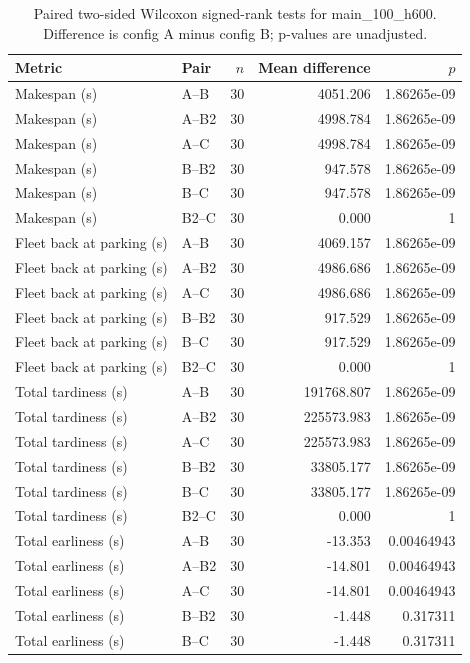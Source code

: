\begin{table}[t]
\centering
\caption{Paired two-sided Wilcoxon signed-rank tests for main\_100\_h600. Difference is config A minus config B; p-values are unadjusted.}
\label{tab:main-100-h600-paired}
\begin{tabular}{llrrr}
\toprule
Metric & Pair & $n$ & Mean difference & $p$ \\
\midrule
Makespan (s) & A--B & 30 & 4051.206 & 1.86265e-09 \\
Makespan (s) & A--B2 & 30 & 4998.784 & 1.86265e-09 \\
Makespan (s) & A--C & 30 & 4998.784 & 1.86265e-09 \\
Makespan (s) & B--B2 & 30 & 947.578 & 1.86265e-09 \\
Makespan (s) & B--C & 30 & 947.578 & 1.86265e-09 \\
Makespan (s) & B2--C & 30 & 0.000 & 1 \\
Fleet back at parking (s) & A--B & 30 & 4069.157 & 1.86265e-09 \\
Fleet back at parking (s) & A--B2 & 30 & 4986.686 & 1.86265e-09 \\
Fleet back at parking (s) & A--C & 30 & 4986.686 & 1.86265e-09 \\
Fleet back at parking (s) & B--B2 & 30 & 917.529 & 1.86265e-09 \\
Fleet back at parking (s) & B--C & 30 & 917.529 & 1.86265e-09 \\
Fleet back at parking (s) & B2--C & 30 & 0.000 & 1 \\
Total tardiness (s) & A--B & 30 & 191768.807 & 1.86265e-09 \\
Total tardiness (s) & A--B2 & 30 & 225573.983 & 1.86265e-09 \\
Total tardiness (s) & A--C & 30 & 225573.983 & 1.86265e-09 \\
Total tardiness (s) & B--B2 & 30 & 33805.177 & 1.86265e-09 \\
Total tardiness (s) & B--C & 30 & 33805.177 & 1.86265e-09 \\
Total tardiness (s) & B2--C & 30 & 0.000 & 1 \\
Total earliness (s) & A--B & 30 & -13.353 & 0.00464943 \\
Total earliness (s) & A--B2 & 30 & -14.801 & 0.00464943 \\
Total earliness (s) & A--C & 30 & -14.801 & 0.00464943 \\
Total earliness (s) & B--B2 & 30 & -1.448 & 0.317311 \\
Total earliness (s) & B--C & 30 & -1.448 & 0.317311 \\

\end{tabular}
\end{table}
